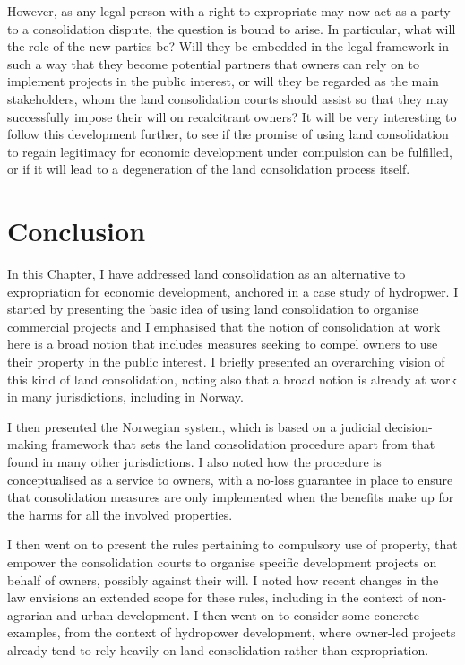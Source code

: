 However, as any legal person with a right to expropriate may now act as a party to a consolidation dispute, the question is bound to arise. In particular, what will the role of the new parties be? Will they be embedded in the legal framework in such a way that they become potential partners that owners can rely on to implement projects in the public interest, or will they be regarded as the main stakeholders, whom the land consolidation courts should assist so that they may successfully impose their will on recalcitrant owners? It will be very interesting to follow this development further, to see if the promise of using land consolidation to regain legitimacy for economic development under compulsion can be fulfilled, or if it will lead to a degeneration of the land consolidation process itself.

\section{Conclusion}\label{sec:conc}

In this Chapter, I have addressed land consolidation as an alternative to expropriation for economic development, anchored in a case study of hydropwer. I started by presenting the basic idea of using land consolidation to organise commercial projects and I emphasised that the notion of consolidation at work here is a broad notion that includes measures seeking to compel owners to use their property in the public interest. I briefly presented an overarching vision of this kind of land consolidation, noting also that a broad notion is already at work in many jurisdictions, including in Norway. 

I then presented the Norwegian system, which is based on a judicial decision-making framework that sets the land consolidation procedure apart from that found in many other jurisdictions. I also noted how the procedure is conceptualised as a service to owners, with a no-loss guarantee in place to ensure that consolidation measures are only implemented when the benefits make up for the harms for all the involved properties.

I then went on to present the rules pertaining to compulsory use of property, that empower the consolidation courts to organise specific development projects on behalf of owners, possibly against their will. I noted how recent changes in the law envisions an extended scope for these rules, including in the context of non-agrarian and urban development. I then went on to consider some concrete examples, from the context of hydropower development, where owner-led projects already tend to rely heavily on land consolidation rather than expropriation. 


